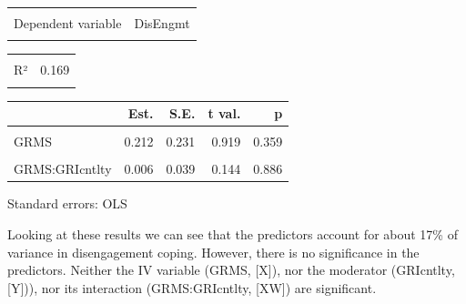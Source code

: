 \documentclass[
  english,
]{book}
\begin{document}
\begin{table}[!h]
\centering
\begin{tabular}{lr}
\toprule
\cellcolor{gray!6}{Observations} & \cellcolor{gray!6}{212}\\
Dependent variable & DisEngmt\\
\cellcolor{gray!6}{Type} & \cellcolor{gray!6}{OLS linear regression}\\
\bottomrule
\end{tabular}
\end{table} \begin{table}[!h]
\centering
\begin{tabular}{lr}
\toprule
\cellcolor{gray!6}{F(3,208)} & \cellcolor{gray!6}{14.099}\\
R² & 0.169\\
\cellcolor{gray!6}{Adj. R²} & \cellcolor{gray!6}{0.157}\\
\bottomrule
\end{tabular}
\end{table} \begin{table}[!h]
\centering
\begin{threeparttable}
\begin{tabular}{lrrrr}
\toprule
  & Est. & S.E. & t val. & p\\
\midrule
\cellcolor{gray!6}{(Intercept)} & \cellcolor{gray!6}{1.417} & \cellcolor{gray!6}{0.517} & \cellcolor{gray!6}{2.741} & \cellcolor{gray!6}{0.007}\\
GRMS & 0.212 & 0.231 & 0.919 & 0.359\\
\cellcolor{gray!6}{GRIcntlty} & \cellcolor{gray!6}{-0.027} & \cellcolor{gray!6}{0.090} & \cellcolor{gray!6}{-0.299} & \cellcolor{gray!6}{0.765}\\
GRMS:GRIcntlty & 0.006 & 0.039 & 0.144 & 0.886\\
\bottomrule
\end{tabular}
\begin{tablenotes}
\item Standard errors: OLS
\end{tablenotes}
\end{threeparttable}
\end{table}

Looking at these results we can see that the predictors account for about 17\% of variance in disengagement coping. However, there is no significance in the predictors. Neither the IV variable (GRMS, {[}X{]}), nor the moderator (GRIcntlty, {[}Y{]})), nor its interaction (GRMS:GRIcntlty, {[}XW{]}) are significant.
\end{document}
